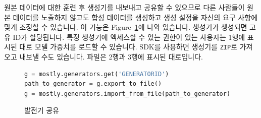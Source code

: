 원본 데이터에 대한 훈련 후 생성기를 내보내고 공유할 수 있으므로 다른 사람들이 원본 데이터를 노출하지 않고도 합성 데이터를 생성하고 생성 설정을 자신의 요구 사항에 맞게 조정할 수 있습니다.
이 기능은 Figure~\ref{lst:snippet_2}에 나와 있습니다.
생성기가 생성되면 고유 ID가 할당됩니다.
특정 생성기에 액세스할 수 있는 권한이 있는 사용자는 1행에 표시된 대로 모델 가중치를 로드할 수 있습니다.
SDK를 사용하면 생성기를 \verb|ZIP|로 가져오고 내보낼 수도 있습니다. 파일은 2행과 3행에 표시된 대로입니다.


\begin{figure}%
\begin{lstlisting}[language=Python]
g = mostly.generators.get('GENERATORID')
path_to_generator = g.export_to_file()
g = mostly.generators.import_from_file(path_to_generator)
\end{lstlisting}
\caption{발전기 공유}%
\label{lst:snippet_2}%
\end{figure}


